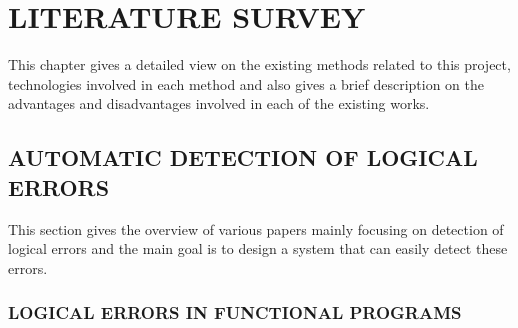 
\chapter{\uppercase{Literature Survey}} %
\label{ch:survey} %

This chapter gives a detailed view on the existing methods related
to this project, technologies involved in each method and also gives a brief
description on the advantages and disadvantages involved in each of the existing
works.
\section{\uppercase{AUTOMATIC DETECTION OF LOGICAL ERRORS}}
This section gives the overview of various papers mainly focusing on detection of logical errors and the main goal is to design a system that can easily detect these errors.
\justifying
\subsection{ LOGICAL ERRORS IN FUNCTIONAL PROGRAMS}


